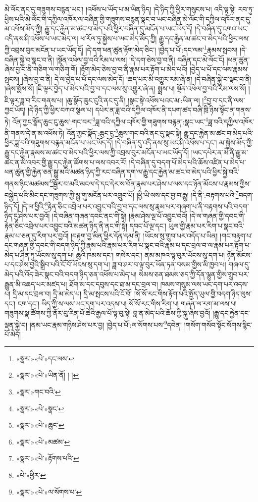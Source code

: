 མེ་ལོང་ནང་དུ་གཟུགས་བརྙན་ཡང་། །འཕོས་པ་ཡོད་པ་མ་ཡིན་ཉིད། །དེ་ཉིད་ཀྱི་ཕྱིར་གསུངས་པ། འདི་ལྟ་སྟེ། རབ་ཏུ་ཕྱིས་པའི་མེ་ལོང་གི་དཀྱིལ་འཁོར་ལ་བཞིན་གྱི་གཟུགས་བརྙན་སྣང་བ་ཡང་བཞིན་མེ་ལོང་གི་དཀྱིལ་འཁོར་ནང་དུ་མ་འཕོས་མོད་ཀྱི། རྒྱུ་དང་རྐྱེན་མ་ཚང་བ་མེད་པའི་ཕྱིར་བཞིན་དུ་མངོན་པ་ཡང་ཡོད་དོ། །དེ་བཞིན་དུ་འགའ་ཡང་འདི་ནས་ཤི་འཕོས་པ་ཡང་མེད་ལ། ཕ་རོལ་ཏུ་སྐྱེས་པ་ཡང་མེད་མོད་ཀྱི། རྒྱུ་དང་རྐྱེན་མ་ཚང་བ་མེད་པའི་ཕྱིར་ལས་ཀྱི་འབྲས་བུར་མངོན་པ་ཡང་ཡོད་དོ། །དེ་དག་ཕན་ཚུན་རྟོག་མེད་ཅིང་། །བྱེད་པ་པོ་:དང་ལམ་\footnote{«སྣར་»«པེ་»དང་ལས་}རྣམས་སྤངས། །དེ་བཞིན་སྐྱེ་བ་སྣང་བ་ནི། །སྔོན་འཕེལ་བྱ་བའི་རིམ་པ་ལས། །དེ་དག་ཅེས་བྱ་བ་ནི། བཞིན་དང་མེ་ལོང་ངོ། །ཕན་ཚུན་ཞེས་བྱ་བ་ནི་གཅིག་ལ་གཅིག་གོ། །རྟོག་མེད་ཅེས་བྱ་བ་ནི་རྣམ་པར་རྟོག་པ་མེད་པའོ། །བྱེད་པ་པོ་དང་ལས་རྣམས་སྤངས། །ཞེས་བྱ་བ་ནི། དེ་ལ་བྱེད་པ་པོ་དང་ལས་མེད་དོ། །ཆད་པར་མི་འགྱུར་རམ་ཞེ་ན། །དེ་བཞིན་སྐྱེ་བ་སྣང་བ་ནི། །ཞེས་སྨོས་སོ། །ཇི་ལྟར་བྱེད་པ་མེད་པའི་བྱ་བ་དང་ལས་སུ་འགྱུར་ཞེ་ན། སྨྲས་པ། སྔོན་འཕེལ་བྱ་བའི་རིམ་ལས་སོ། །ཇི་ལྟར་ཟླ་བ་རིང་གནས་པ། །ཆུ་སྣོད་ཆུང་ངུའི་ནང་དུ་ནི། །སྣང་སྟེ་འཕོས་པའང་མ་:ཡིན་ལ། །\footnote{«སྣར་»«པེ་»ཡིན་ནོ། ། །}བྱ་བ་དང་ནི་ལས་ཀྱང་ཡོད། །དེ་ཉིད་ཀྱི་ཕྱིར་བཀའ་སྩལ་པ། དཔེར་ན་ཟླ་བའི་དཀྱིལ་འཁོར་ནི་དཔག་ཚད་བཞི་ཁྲི་ཉིས་སྟོང་ན་གནས་ཏེ། འོན་ཀྱང་སྣོད་ཆུང་ངུ་ཆུས་:གང་བར་\footnote{«སྣར་»གང་བའི་}ཟླ་བའི་དཀྱིལ་འཁོར་གྱི་གཟུགས་བརྙན་:སྣང་ཡང་\footnote{«སྣར་»«པེ་»སྣང་}ཟླ་བའི་དཀྱིལ་འཁོར་ནི་གནས་དེ་ན་མ་འཕོས་ཏེ། འོན་ཀྱང་སྣོད་:ཆུང་ངུ་\footnote{«སྣར་»«པེ་»ཆུང་}ཆུས་གང་བའི་ནང་དུ་སྣང་སྟེ། རྒྱུ་དང་རྐྱེན་མ་ཚང་བ་མེད་པའི་ཕྱིར་ཟླ་བའི་གཟུགས་བརྙན་མངོན་པ་ཡང་ཡོད་དོ། །དེ་བཞིན་དུ་འདི་ནས་སུ་ཡང་ཤི་འཕོས་པ་དང་། མ་སྐྱེས་མོད་ཀྱི་རྒྱུ་དང་རྐྱེན་རྣམས་མ་ཚང་བ་མེད་པའི་ཕྱིར་ལས་ཀྱི་འབྲས་བུར་མངོན་པ་ཡང་ཡོད་དོ། །ཡང་དཔེར་ན་མེ་ནི་རྒྱུ་མ་ཚང་ན་མི་འབར་གྱི་རྒྱུ་དང་རྐྱེན་ཚོགས་པ་ལས་འབར་རོ། །དེ་བཞིན་དུ་བདག་པོ་མེད་པའི་ཆོས་འཛིན་པ་མེད་པ་ཕན་ཚུན་གྱི་རྐྱེན་ཅན་སྒྱུ་མའི་མཚན་ཉིད་ཀྱི་རང་བཞིན་དག་ལ་རྒྱུ་དང་རྐྱེན་མ་ཚང་བ་མེད་པའི་ཕྱིར་སྐྱེ་བའི་གནས་ཉིང་མཚམས་\footnote{«སྣར་»«པེ་»མཚམ་}སྦྱོར་བ་མའི་མངལ་དེ་དང་དེར་ས་བོན་རྣམ་པར་ཤེས་པ་ལས་དང་ཉོན་མོངས་པ་རྣམས་ཀྱིས་བསྐྱེད་པའི་མིང་དང་གཟུགས་ཀྱི་མྱུ་གུ་མངོན་པར་འགྲུབ་པོ། །ཕྱི་ཡི་ལས་དང་བྱ་བ་རྒྱུ། །དེ་ནི་:བརྟགས་པའི་\footnote{«སྣར་»«པེ་»རྟོགས་པའི་}བདག་ཉིད་དོ། །དེ་ལ་ཕྱིའི་\footnote{«པེ་»ཕྱིར་}རྟེན་ཅིང་འབྲེལ་པར་འབྱུང་བའི་བྱ་བ་དང་ལས་སུ་རྣམ་པར་གཞག་པ་ནི་བརྟགས་པའི་བདག་ཉིད་དུ་ཤེས་པར་བྱའོ། །དེ་བཞིན་གཞན་དབང་ནང་གི་སྟེ། །རྣམ་ཤེས་ལྔ་པོ་འབྱུང་བའོ། །དེ་ལ་གཞན་གྱི་དབང་གི་རྟེན་ཅིང་འབྲེལ་པར་འབྱུང་བའི་མཚན་ཉིད་ནི་ནང་གི་སྟེ། དབང་པོ་ལྔ་དང་། ཡུལ་གྱི་རྣམ་པར་རིག་པ་སྣང་བའི་རྣམ་པ་ཅན་དུ་རིག་པར་བྱའོ། །བརྟག་བྱ་མིན་ཕྱིར་དོན་དམ་ནི། །ཡོངས་སུ་གྲུབ་པར་འདོད་པ་ཡིན། །གང་བརྟག་པ་དང་གཞན་གྱི་དབང་གི་བདག་ཉིད་ཀྱི་རྣམ་པའི་རྣམ་པར་རིག་པ་སྣང་བའི་རྣམ་པ་དང་བྲལ་བ་ལ་རྣམ་པར་རྟོག་པ་མེད་པ་ཤིན་ཏུ་ཡོངས་སུ་དག་པ། ཆུའི་ཁམས་དང་། གསེར་དང་། ནམ་མཁའ་ལྟ་བུར་ཡོངས་སུ་དག་པ། ཉོན་མོངས་པ་དང་ཤེས་བྱའི་སྒྲིབ་པའི་ངོ་བོ་ཡོངས་སུ་དག་པ། ཟླ་བ་ཤར་བ་ལྟ་བུར་ཡོན་ཏན་བསམ་གྱིས་མི་ཁྱབ་པ། གཞལ་དུ་མེད་པའི་འོད་ཟེར་སྣང་བའི་བདག་ཉིད་ཅན་འཕོས་པ་མེད་པ། སེམས་ཅན་ཐམས་ཅད་ཀྱི་དོན་ལྷུན་གྱིས་གྲུབ་པར་རྒྱུན་མི་འཆད་པར་མཛད་པ། ཐོག་མ་དང་དབུས་དང་ཐ་མ་དང་བྲལ་བ། ཁམས་གསུམ་ལས་ཡང་དག་པར་འདས་པ། དྲི་མ་དང་བྲལ་བ། དྲི་མ་མེད་པ། དྲི་མ་སྤངས་པའི་ངོ་བོ། །སོ་སོ་རང་གིས་རྟོག་པའི་སྤྱོད་ཡུལ་གྱི་བདག་ཉིད་ལུས་དང་། ངག་དང་། ཡིད་ཀྱི་ས་ལས་ཡང་དག་པར་འདས་པ། སོ་སོ་རང་གིས་རིག་པ། གཞན་ལ་རག་མ་ལས་པ། གཟུགས་སྣ་ཚོགས་ཀྱི་ནོར་བུ་རིན་པོ་ཆེའི་རྒྱལ་པོ་ལྟ་བུ་སྟེ། བླ་ན་མེད་པའི་ཆོས་ཀྱི་སྐུ་ཞེས་བྱའོ། །རྒྱུ་དང་རྐྱེན་དང་ལྡན་སྐྱེ་བ། །ནམ་ཡང་རྣམ་གཉིས་ཤེས་པར་བྱ། །བྱེད་པ་པོ་:ལ་སོགས་པས་\footnote{«སྣར་»«པེ་»ལ་སོགས་པ་}དབེན། །གསོག་གསོབ་སྟོང་སོགས་སྙིང་པོ་མེད། 